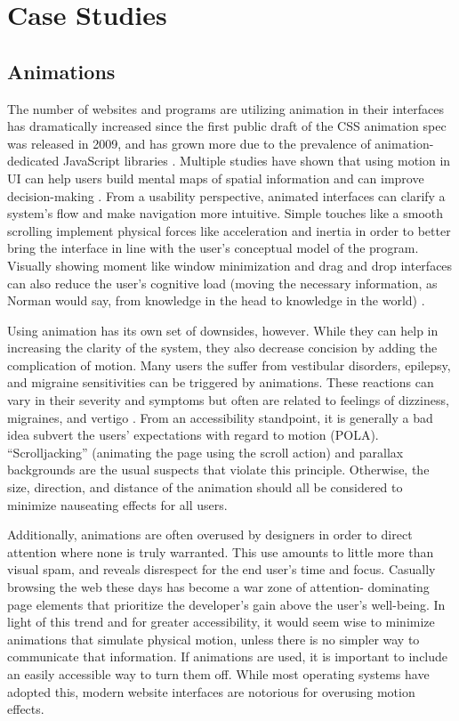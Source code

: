 \documentclass[12pt, oneside]{article}
\begin{document}
\section{Case Studies}

\subsection{Animations}

The number of websites and programs are utilizing animation in their interfaces has dramatically increased since the first public draft of the CSS animation spec was released in 2009, and has grown more due to the prevalence of animation-dedicated JavaScript libraries \cite{trends}. Multiple studies have shown that using motion in UI can help users build mental maps of spatial information and can improve decision-making \cite{bederson_boltman_1999} \cite{gonzalez_1996}. From a usability perspective, animated interfaces can clarify a system's flow and make navigation more intuitive. Simple touches like a smooth scrolling implement physical forces like acceleration and inertia in order to better bring the interface in line with the user's conceptual model of the program. Visually showing moment like window minimization and drag and drop interfaces can also reduce the user's cognitive load (moving the necessary information, as Norman would say, from knowledge in the head to knowledge in the world) \cite[p.~74]{norman_2013}.

Using animation has its own set of downsides, however. While they can help in increasing the clarity of the system, they also decrease concision by adding the complication of motion. Many users the suffer from vestibular disorders, epilepsy, and migraine sensitivities can be triggered by animations. These reactions can vary in their severity and symptoms but often are related to feelings of dizziness, migraines, and vertigo \cite{head_2015}. From an accessibility standpoint, it is generally a bad idea subvert the users' expectations with regard to motion (POLA). ``Scrolljacking'' (animating the page using the scroll action) and parallax backgrounds are the usual suspects that violate this principle. Otherwise, the size, direction, and distance of the animation should all be considered to minimize nauseating effects for all users.

Additionally, animations are often overused by designers in order to direct attention where none is truly warranted. This use amounts to little more than visual spam, and reveals disrespect for the end user's time and focus. Casually browsing the web these days has become a war zone of attention- dominating page elements that prioritize the developer's gain above the user's well-being. In light of this trend and for greater accessibility, it would seem wise to minimize animations that simulate physical motion, unless there is no simpler way to communicate that information. If animations are used, it is important to include an easily accessible way to turn them off. While most operating systems have adopted this, modern website interfaces are notorious for overusing motion effects.
\end{document}
